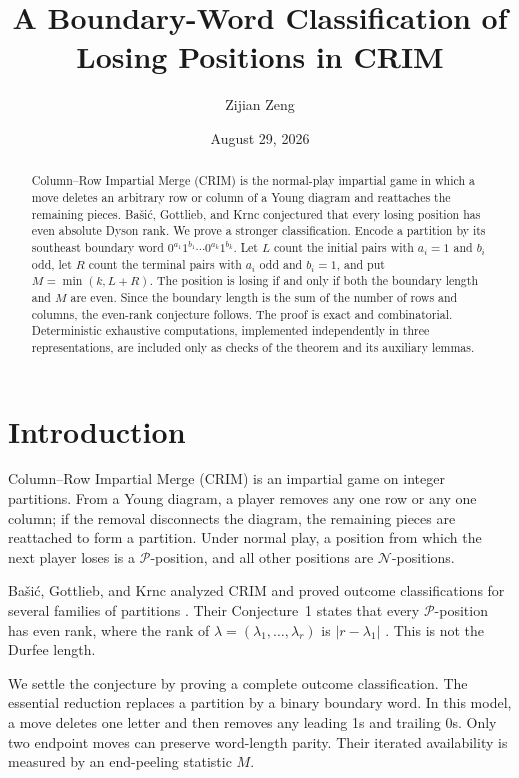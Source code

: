 \documentclass[11pt]{amsart}
\title{A Boundary-Word Classification of Losing Positions in CRIM}
\author{Zijian Zeng}
\date{August 29, 2026}
\theoremstyle{definition}
\newcommand{\cP}{\mathcal P}
\newcommand{\cN}{\mathcal N}
\begin{document}
\begin{abstract}
Column--Row Impartial Merge (CRIM) is the normal-play impartial game in
which a move deletes an arbitrary row or column of a Young diagram and
reattaches the remaining pieces.  Ba\v{s}i\'c, Gottlieb, and Krnc conjectured
that every losing position has even absolute Dyson rank.  We prove a stronger
classification.  Encode a partition by its southeast boundary word
$0^{a_1}1^{b_1}\cdots0^{a_k}1^{b_k}$.  Let $L$ count the initial pairs with
$a_i=1$ and $b_i$ odd, let $R$ count the terminal pairs with $a_i$ odd and
$b_i=1$, and put $M=\min(k,L+R)$.  The position is losing if and only if both
the boundary length and $M$ are even.  Since the boundary length is the sum
of the number of rows and columns, the even-rank conjecture follows.  The
proof is exact and combinatorial.  Deterministic exhaustive computations,
implemented independently in three representations, are included only as
checks of the theorem and its auxiliary lemmas.
\end{abstract}

\maketitle

\section{Introduction}

Column--Row Impartial Merge (CRIM) is an impartial game on integer
partitions.  From a Young diagram, a player removes any one row or any one
column; if the removal disconnects the diagram, the remaining pieces are
reattached to form a partition.  Under normal play, a position from which the
next player loses is a $\cP$-position, and all other positions are
$\cN$-positions.

Ba\v{s}i\'c, Gottlieb, and Krnc analyzed CRIM and proved outcome
classifications for several families of partitions
\cite{BasicGottliebKrnc2026}.  Their Conjecture~1 states that every
$\cP$-position has even rank, where the rank of
$\lambda=(\lambda_1,\ldots,\lambda_r)$ is
$|r-\lambda_1|$ \cite[Sections~2.1 and~5]{BasicGottliebKrnc2026}.  This is
not the Durfee length.

We settle the conjecture by proving a complete outcome classification.  The
essential reduction replaces a partition by a binary boundary word.  In this
model, a move deletes one letter and then removes any leading 1s and trailing
0s.  Only two endpoint moves can preserve word-length parity.  Their iterated
availability is measured by an end-peeling statistic $M$.
\end{document}

